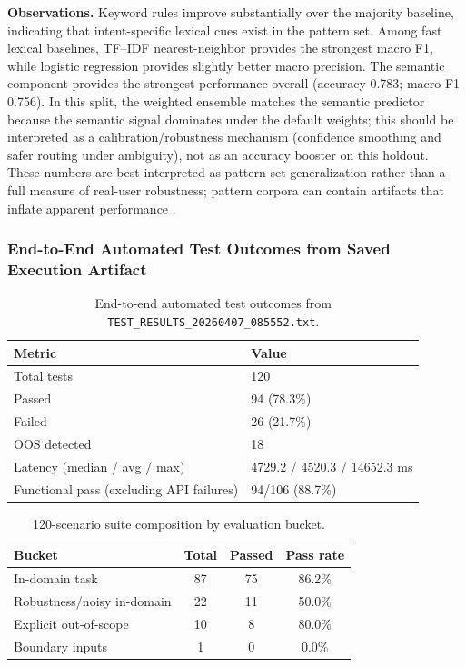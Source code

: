 \documentclass[12pt,onecolumn]{report}
\begin{document}
\textbf{Observations.} Keyword rules improve substantially over the majority baseline, indicating that intent-specific lexical cues exist in the pattern set. Among fast lexical baselines, TF--IDF nearest-neighbor provides the strongest macro F1, while logistic regression provides slightly better macro precision. The semantic component provides the strongest performance overall (accuracy 0.783; macro F1 0.756). In this split, the weighted ensemble matches the semantic predictor because the semantic signal dominates under the default weights; this should be interpreted as a calibration/robustness mechanism (confidence smoothing and safer routing under ambiguity), not as an accuracy booster on this holdout. These numbers are best interpreted as pattern-set generalization rather than a full measure of real-user robustness; pattern corpora can contain artifacts that inflate apparent performance \cite{gururangan2018annotation,geva2019shortcut}.

\subsubsection{End-to-End Automated Test Outcomes from Saved Execution Artifact}
\begin{table}[t]
\caption{End-to-end automated test outcomes from \texttt{TEST\_RESULTS\_20260407\_085552.txt}.}
\label{tab:results-e2e}
\centering
\small
\renewcommand{\arraystretch}{1.25}
\setlength{\tabcolsep}{6pt}
\begin{tabular}{l p{}}
\toprule
\textbf{Metric} & \textbf{Value}\\
\midrule
Total tests & 120\\
Passed & 94 (78.3\%)\\
Failed & 26 (21.7\%)\\
OOS detected & 18\\
Latency (median / avg / max) & 4729.2 / 4520.3 / 14652.3 ms\\
Functional pass (excluding API failures) & 94/106 (88.7\%)\\
\bottomrule
\end{tabular}
\end{table}

\begin{table}[t]
\caption{120-scenario suite composition by evaluation bucket.}
\label{tab:suite-composition}
\centering
\small
\renewcommand{\arraystretch}{1.25}
\setlength{\tabcolsep}{6pt}
\begin{tabular}{l c c c}
\toprule
\textbf{Bucket} & \textbf{Total} & \textbf{Passed} & \textbf{Pass rate}\\
\midrule
In-domain task & 87 & 75 & 86.2\%\\
Robustness/noisy in-domain & 22 & 11 & 50.0\%\\
Explicit out-of-scope & 10 & 8 & 80.0\%\\
Boundary inputs & 1 & 0 & 0.0\%\\
\bottomrule
\end{tabular}
\end{table}
\end{document}
